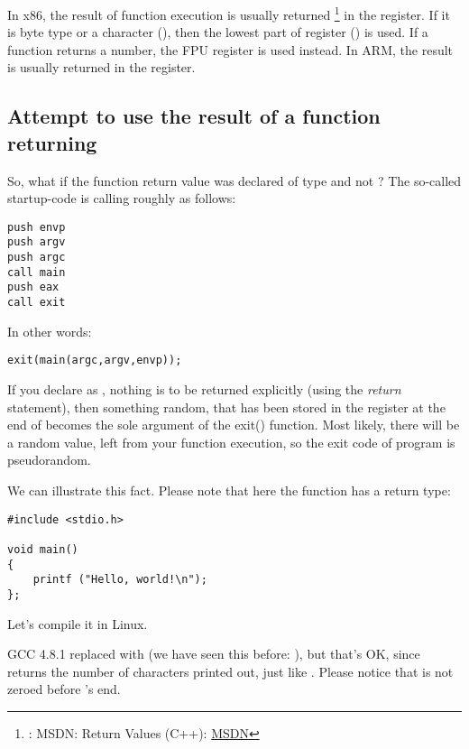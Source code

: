 

In x86, the result of function execution is usually returned
\footnote{\Seealso: MSDN: Return Values (C++): \href{http://go.yurichev.com/17258}{MSDN}}
in the \EAX register. 
If it is byte type or a character (\Tchar), then the lowest part of register \EAX (\AL) is used. 
If a function returns a \Tfloat number, the FPU register  is used instead.
In ARM, the result is usually returned in the  register.

\subsection{Attempt to use the result of a function returning \Tvoid}
\label{UseResultOfVoidFunc}

So, what if the \main function return value was declared of type \Tvoid and not \Tint?
The so-called startup-code is calling \main roughly as follows:

\begin{lstlisting}[style=customasmx86]
push envp
push argv
push argc
call main
push eax
call exit
\end{lstlisting}

In other words:

\begin{lstlisting}[style=customc]
exit(main(argc,argv,envp));
\end{lstlisting}

If you declare \main as \Tvoid, nothing is to be returned explicitly (using the \emph{return} statement),
then something random, that has been stored in the \EAX register at the end of \main becomes 
the sole argument of the exit() function.
Most likely, there will be a random value, left from your function execution, so the exit code of program is pseudorandom.
\par
We can illustrate this fact. 
Please note that here the \main function has a \Tvoid return type:

\begin{lstlisting}[style=customc]
#include <stdio.h>

void main()
{
	printf ("Hello, world!\n");
};
\end{lstlisting}

Let's compile it in Linux.

GCC 4.8.1 replaced \printf with \puts 
(we have seen this before: ), but that's OK,
since \puts returns the number of characters printed out, just like \printf.
Please notice that \EAX is not zeroed before \main's end.

